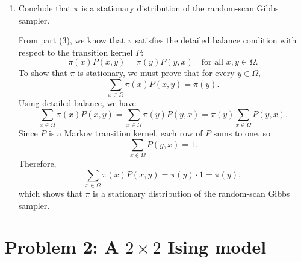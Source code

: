 \documentclass[answers,12pt,addpoints]{exam}
\begin{document}
\begin{enumerate}
\begin{solution}
\medskip
\noindent\textbf{Case 3: $x$ and $y$ differ in exactly one coordinate.}
Suppose $x$ and $y$ differ only in the $i$-th coordinate, and that
$x_{-i} = y_{-i}$. By part (2),
\[
P(x,y) = \frac{1}{d} \,\pi(y_i \mid x_{-i}), 
\qquad
P(y,x) = \frac{1}{d} \,\pi(x_i \mid y_{-i}).
\]
Since $x_{-i} = y_{-i}$, we can write both conditionals with the same
conditioning argument and use the definition of conditional probability:
\[
\pi(y_i \mid x_{-i})
= \frac{\pi(y_i, x_{-i})}{\pi(x_{-i})}
= \frac{\pi(y)}{\pi(x_{-i})},
\qquad
\pi(x_i \mid y_{-i})
= \frac{\pi(x_i, y_{-i})}{\pi(y_{-i})}
= \frac{\pi(x)}{\pi(y_{-i})}.
\]
Again using $x_{-i} = y_{-i}$, we obtain
\[
\pi(y_i \mid x_{-i}) = \frac{\pi(y)}{\pi(x_{-i})}, 
\qquad
\pi(x_i \mid y_{-i}) = \frac{\pi(x)}{\pi(x_{-i})}.
\]
Therefore,
\[
\pi(x) P(x,y)
= \pi(x)\,\frac{1}{d}\,\pi(y_i \mid x_{-i})
= \frac{1}{d} \,\pi(x)\,\frac{\pi(y)}{\pi(x_{-i})},
\]
and
\[
\pi(y) P(y,x)
= \pi(y)\,\frac{1}{d}\,\pi(x_i \mid y_{-i})
= \frac{1}{d} \,\pi(y)\,\frac{\pi(x)}{\pi(x_{-i})}.
\]
These two expressions are equal, hence
\[
\pi(x) P(x,y) = \pi(y) P(y,x)
\]
whenever $x$ and $y$ differ in exactly one coordinate.

\medskip
Combining the three cases, we conclude that the random-scan Gibbs sampler
satisfies the detailed balance condition with respect to $\pi$.
    \end{solution}
    \item Conclude that $\pi$ is a stationary distribution of the random-scan Gibbs sampler.
    \begin{solution}
        From part (3), we know that $\pi$ satisfies the detailed balance condition
with respect to the transition kernel $P$:
\[
\pi(x) P(x,y) = \pi(y) P(y,x)
\quad \text{for all } x,y \in \Omega.
\]
To show that $\pi$ is stationary, we must prove that for every $y \in \Omega$,
\[
\sum_{x \in \Omega} \pi(x) P(x,y) = \pi(y).
\]
Using detailed balance, we have
\[
\sum_{x \in \Omega} \pi(x) P(x,y)
= \sum_{x \in \Omega} \pi(y) P(y,x)
= \pi(y) \sum_{x \in \Omega} P(y,x).
\]
Since $P$ is a Markov transition kernel, each row of $P$ sums to one, so
\[
\sum_{x \in \Omega} P(y,x) = 1.
\]
Therefore,
\[
\sum_{x \in \Omega} \pi(x) P(x,y)
= \pi(y) \cdot 1
= \pi(y),
\]
which shows that $\pi$ is a stationary distribution of the random-scan Gibbs
sampler.
    \end{solution}
\end{enumerate}



\section*{Problem 2: A $2\times 2$ Ising model}
\end{document}
